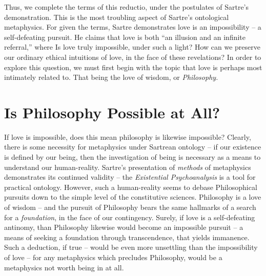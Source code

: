 Thus, we complete the terms of this reductio, under the postulates of Sartre's demonstration. This is the most troubling aspect of Sartre's ontological metaphysics. For given the terms, Sartre demonstrates love is an impossibility -- a self-defeating pursuit. He claims that love is both \enquote{an illusion and an infinite referral,} where  Is love truly impossible, under such a light? How can we preserve our ordinary ethical intuitions of love, in the face of these revelations? In order to explore this question, we must first begin with the topic that love is perhaps most intimately related to. That being the love of wisdom, or \emph{Philosophy.}

\section{Is Philosophy Possible at All?}

If love is impossible, does this mean philosophy is likewise impossible? Clearly, there is some necessity for metaphysics under Sartrean ontology -- if our existence is defined by our being, then the investigation of being is necessary as a means to understand our human-reality. Sartre's presentation of \emph{methods} of metaphysics demonstrates its continued validity -- the \emph{Existential Psychoanalysis} \autocite[723]{Sartre} is a tool for practical ontology. However, such a human-reality seems to debase Philosophical pursuits down to the simple level of the constitutive sciences. Philosophy is a love of wisdom -- and the pursuit of Philosophy bears the same hallmarks of a search for a \emph{foundation}, in the face of our contingency. Surely, if love is a self-defeating antinomy, than Philosophy likewise would become an impossible pursuit -- a means of seeking a foundation through transcendence, that yields immanence. Such a deduction, if true -- would be even more unsettling than the impossibility of love -- for any metaphysics which precludes Philosophy, would be a metaphysics not worth being in at all.


